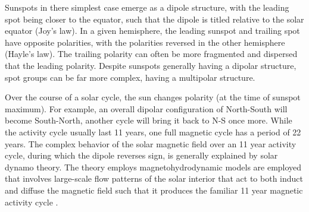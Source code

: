 Sunspots in there simplest case emerge as a dipole structure, with the leading spot being closer to the equator, such that the dipole is titled relative to the solar equator (Joy's law). In a given hemisphere, the leading sunspot and trailing spot have opposite polarities, with the polarities reversed in the other hemisphere  (Hayle's law). The trailing polarity can often be more fragmented and dispersed that the leading polarity. Despite sunspots generally having a dipolar structure, spot groups can be far more complex, having a multipolar structure.

Over the course of a solar cycle, the sun changes polarity (at the time of sunspot maximum). For example, an overall dipolar configuration of North-South will become South-North, another cycle will bring it back to N-S once more. While the activity cycle usually last 11 years, one full magnetic cycle has a period of 22 years. The complex behavior of the solar magnetic field over an 11 year activity cycle, during which the dipole reverses sign, is generally explained by solar dynamo theory. The theory employs magnetohydrodynamic models are employed that involves large-scale flow patterns of the solar interior that act to both induct and diffuse the magnetic field such that it produces the familiar 11 year magnetic activity cycle \citep{charbon2010}. 


